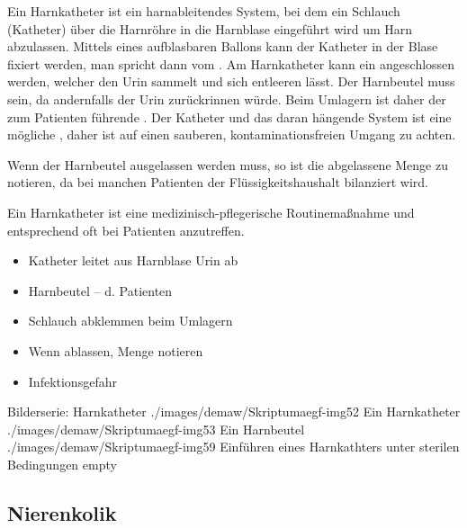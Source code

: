 {Ein Harnkatheter ist ein harnableitendes System, bei dem ein
Schlauch (Katheter) über die Harnröhre in die Harnblase
eingeführt wird um Harn abzulassen. Mittels eines
aufblasbaren Ballons kann der Katheter in der Blase fixiert
werden, man spricht dann vom . Am
Harnkatheter kann ein  angeschlossen werden,
welcher den Urin sammelt und sich entleeren lässt. Der
Harnbeutel muss  sein, da
andernfalls der Urin zurückrinnen würde. Beim Umlagern
ist daher der zum Patienten führende . Der Katheter und das daran hängende System ist
eine mögliche , daher ist auf einen
sauberen, kontaminationsfreien Umgang zu achten.

Wenn der Harnbeutel ausgelassen werden muss, so ist die
abgelassene Menge zu notieren, da bei manchen Patienten der
Flüssigkeitshaushalt bilanziert wird.

Ein Harnkatheter ist eine
medizinisch-pflegerische Routinemaßnahme und entsprechend oft bei Patienten anzutreffen.}
{
\begin{itemize}
  \item Katheter leitet aus Harnblase Urin ab
  \item Harnbeutel --  d. Patienten
  \item Schlauch abklemmen beim Umlagern
  \item Wenn ablassen, Menge notieren
  \item Infektionsgefahr
\end{itemize}
}
{}
{}
{}



\begin{PictureSeriesWide}{}{Bilderserie: Harnkatheter}
{./images/demaw/Skriptumaegf-img52}
{Ein Harnkatheter }
{./images/demaw/Skriptumaegf-img53}
{Ein Harnbeutel }
{./images/demaw/Skriptumaegf-img59}
{Einführen eines Harnkathters
unter sterilen Bedingungen }
{empty}{}
\end{PictureSeriesWide}


\subsection{Nierenkolik}
\label{topic:nierenkolik}


